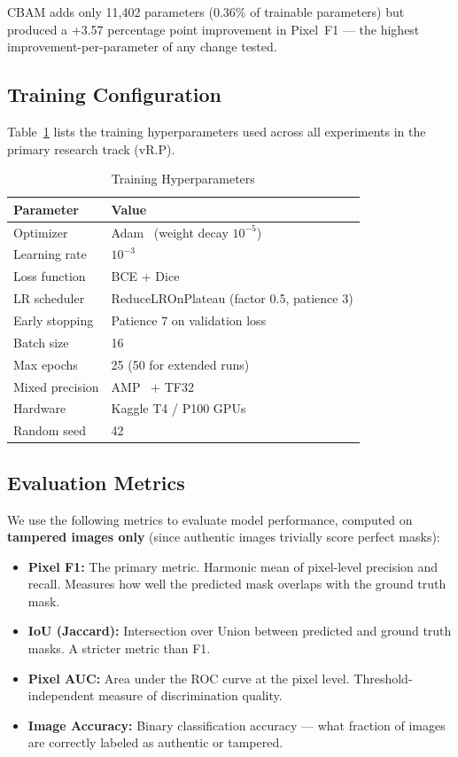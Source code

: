 \documentclass[conference]{IEEEtran}
\begin{document}
CBAM adds only 11,402 parameters (0.36\% of trainable parameters) but produced a +3.57 percentage point improvement in Pixel~F1 --- the highest improvement-per-parameter of any change tested.


\subsection{Training Configuration}

Table~\ref{tab:training_config} lists the training hyperparameters used across all experiments in the primary research track (vR.P).

\begin{table}[H]
\centering
\caption{Training Hyperparameters}
\label{tab:training_config}
\begin{tabular}{l l}
\toprule
\textbf{Parameter} & \textbf{Value} \\
\midrule
Optimizer & Adam~\cite{kingma2015adam} (weight decay $10^{-5}$) \\
Learning rate & $10^{-3}$ \\
Loss function & BCE + Dice~\cite{milletari2016vnet} \\
LR scheduler & ReduceLROnPlateau (factor 0.5, patience 3) \\
Early stopping & Patience 7 on validation loss \\
Batch size & 16 \\
Max epochs & 25 (50 for extended runs) \\
Mixed precision & AMP~\cite{micikevicius2018mixed} + TF32 \\
Hardware & Kaggle T4 / P100 GPUs \\
Random seed & 42 \\
\bottomrule
\end{tabular}
\end{table}


\subsection{Evaluation Metrics}

We use the following metrics to evaluate model performance, computed on \textbf{tampered images only} (since authentic images trivially score perfect masks):

\begin{itemize}
    \item \textbf{Pixel F1:} The primary metric. Harmonic mean of pixel-level precision and recall. Measures how well the predicted mask overlaps with the ground truth mask.
    \item \textbf{IoU (Jaccard):} Intersection over Union between predicted and ground truth masks. A stricter metric than F1.
    \item \textbf{Pixel AUC:} Area under the ROC curve at the pixel level. Threshold-independent measure of discrimination quality.
    \item \textbf{Image Accuracy:} Binary classification accuracy --- what fraction of images are correctly labeled as authentic or tampered.
\end{itemize}
\end{document}

